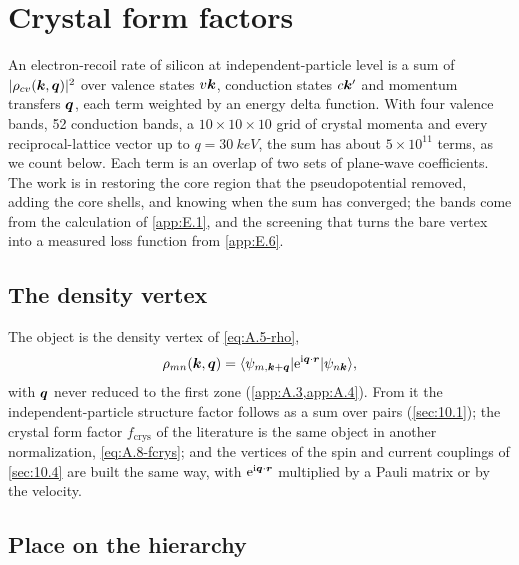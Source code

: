 \section{Crystal form factors}\label{app:E.7}

An electron-recoil rate of silicon at independent-particle level is a sum of $|\rho_{cv}(\bm{k},\bm{q})|^2$ over valence states $v\bm{k}$, conduction states $c\bm{k}'$ and momentum transfers $\bm{q}$, each term weighted by an energy delta function. With four valence bands, 52 conduction bands, a $10\times10\times10$ grid of crystal momenta and every reciprocal-lattice vector up to $q = \SI{30}{keV}$, the sum has about $5\times10^{11}$ terms, as we count below. Each term is an overlap of two sets of plane-wave coefficients. The work is in restoring the core region that the pseudopotential removed, adding the core shells, and knowing when the sum has converged; the bands come from the calculation of \cref{app:E.1}, and the screening that turns the bare vertex into a measured loss function from \cref{app:E.6}.

\subsection{The density vertex}

The object is the density vertex of \cref{eq:A.5-rho},
\begin{equation*}
  \rho_{mn}(\bm{k},\bm{q}) = \langle\psi_{m,\bm{k}+\bm{q}}|\mathrm{e}^{\mathrm{i}\bm{q}\cdot\bm{r}}|\psi_{n\bm{k}}\rangle ,
\end{equation*}
with $\bm{q}$ never reduced to the first zone (\cref{app:A.3,app:A.4}). From it the independent-particle structure factor follows as a sum over pairs (\cref{sec:10.1}); the crystal form factor $f_{\mathrm{crys}}$ of the literature is the same object in another normalization, \cref{eq:A.8-fcrys}; and the vertices of the spin and current couplings of \cref{sec:10.4} are built the same way, with $\mathrm{e}^{\mathrm{i}\bm{q}\cdot\bm{r}}$ multiplied by a Pauli matrix or by the velocity.

\subsection{Place on the hierarchy}

